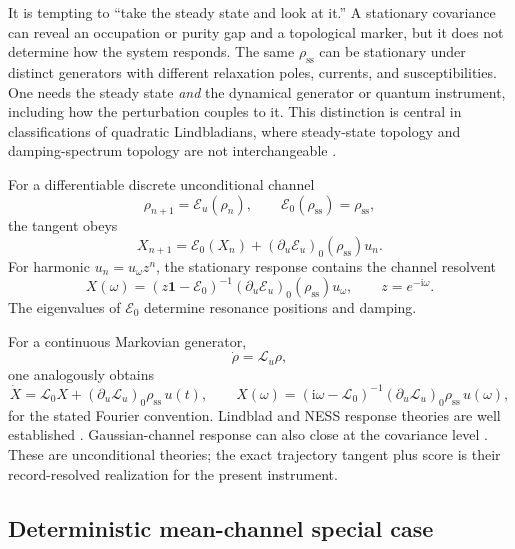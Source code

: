 \documentclass[aps,prb,onecolumn,nofootinbib,superscriptaddress]{revtex4-2}
\newcommand{\Id}{\mathbf{1}}
\newcommand{\ii}{\mathrm{i}}
\newcommand{\cE}{\mathcal{E}}
\newcommand{\cL}{\mathcal{L}}
\newcommand{\ssub}{\mathrm{ss}}
\begin{document}
It is tempting to ``take the steady state and look at it.''  A stationary
covariance can reveal an occupation or purity gap and a topological marker, but
it does not determine how the system responds.  The same $\rho_{\ssub}$ can be
stationary under distinct generators with different relaxation poles,
currents, and susceptibilities.  One needs the steady state \emph{and} the
dynamical generator or quantum instrument, including how the perturbation
couples to it.  This distinction is central in classifications of quadratic
Lindbladians, where steady-state topology and damping-spectrum topology are
not interchangeable \cite{LieuMcGinleyCooper2020}.

For a differentiable discrete unconditional channel
\begin{equation}
  \rho_{n+1}=\cE_u(\rho_n),
  \qquad \cE_0(\rho_{\ssub})=\rho_{\ssub},
\end{equation}
the tangent obeys
\begin{equation}
  X_{n+1}=\cE_0(X_n)+(\partial_u\cE_u)_0(\rho_{\ssub})u_n.
  \label{eq:channel-linearization}
\end{equation}
For harmonic $u_n=u_\omega z^n$, the stationary response contains the channel
resolvent
\begin{equation}
  X(\omega)=
  \left(z\Id-\cE_0\right)^{-1}
  (\partial_u\cE_u)_0(\rho_{\ssub})u_\omega,
  \qquad z=e^{-\ii\omega}.
  \label{eq:discrete-resolvent}
\end{equation}
The eigenvalues of $\cE_0$ determine resonance positions and damping.

For a continuous Markovian generator,
\begin{equation}
  \dot\rho=\cL_u\rho,
\end{equation}
one analogously obtains
\begin{equation}
  \dot X=\cL_0X+(\partial_u\cL_u)_0\rho_{\ssub}\,u(t),
  \qquad
  X(\omega)=(\ii\omega-\cL_0)^{-1}
  (\partial_u\cL_u)_0\rho_{\ssub}\,u(\omega),
  \label{eq:lindblad-resolvent}
\end{equation}
for the stated Fourier convention.  Lindblad and NESS response theories are
well established
\cite{AvronFraasGraf2012,VenutiZanardi2016,AlbertBradlynFraasJiang2016,KonopikLutz2019}.
Gaussian-channel response can also close at the covariance level
\cite{MehboudiParrondoAcin2019}.  These are unconditional theories; the exact
trajectory tangent plus score is their record-resolved realization for the
present instrument.

\subsection{Deterministic mean-channel special case}
\end{document}
